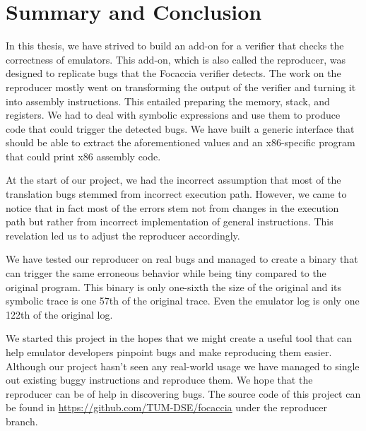 
\chapter{Summary and Conclusion}\label{chapter:summary_and_conclusion}
In this thesis, we have strived to build an add-on for a verifier that checks the correctness of emulators.
This add-on, which is also called the reproducer, was designed to replicate bugs that the Focaccia verifier detects.
The work on the reproducer mostly went on transforming the output of the verifier and turning it into assembly instructions.
This entailed preparing the memory, stack, and registers.
We had to deal with symbolic expressions and use them to produce code that could trigger the detected bugs.
We have built a generic interface that should be able to extract the aforementioned values and an x86-specific program that could print x86 assembly code.

At the start of our project, we had the incorrect assumption that most of the translation bugs stemmed from incorrect execution path.
However, we came to notice that in fact most of the errors stem not from changes in the execution path but rather from incorrect implementation of general instructions.
This revelation led us to adjust the reproducer accordingly.

We have tested our reproducer on real bugs and managed to create a binary that can trigger the same erroneous behavior while being tiny compared to the original program.
This binary is only one-sixth the size of the original and its symbolic trace is one 57th of the original trace.
Even the emulator log is only one 122th of the original log.

We started this project in the hopes that we might create a useful tool that can help emulator developers pinpoint bugs and make reproducing them easier.
Although our project hasn't seen any real-world usage we have managed to single out existing buggy instructions and reproduce them.
We hope that the reproducer can be of help in discovering bugs.
The source code of this project can be found in \url{https://github.com/TUM-DSE/focaccia} under the reproducer branch.